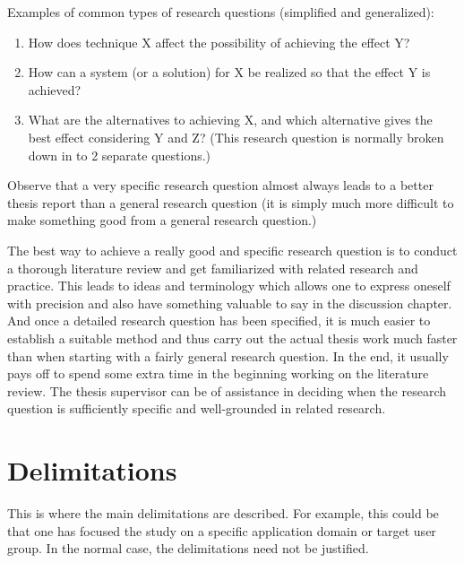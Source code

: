 Examples of common types of research questions (simplified
and generalized):

\begin{enumerate}
\item How does technique X affect the possibility of achieving the
  effect Y?

\item How can a system (or a solution) for X be realized so
  that the effect Y is achieved?

\item What are the alternatives to
  achieving X, and which alternative gives the best effect considering
  Y and Z? (This research question is normally broken down in to 2
  separate questions.)

\end{enumerate}


Observe that a very specific research question almost always
leads to a better thesis report than a general research question
(it is simply much more difficult to make something good
from a general research question.)

The best way to achieve a really good and specific research
question is to conduct a thorough literature review and get
familiarized with related research and practice. This leads to
ideas and terminology which allows one to express oneself
with precision and also have something valuable to say in the
discussion chapter. And once a detailed research question
has been specified, it is much easier to establish a suitable
method and thus carry out the actual thesis work much faster
than when starting with a fairly general research question. In
the end, it usually pays off to spend some extra time in the
beginning working on the literature review. The thesis
supervisor can be of assistance in deciding when the research
question is sufficiently specific and well-grounded in related
research.

\section{Delimitations}
\label{sec:delimitations}

This is where the main delimitations are described. For
example, this could be that one has focused the study on a
specific application domain or target user group. In the
normal case, the delimitations need not be justified.




